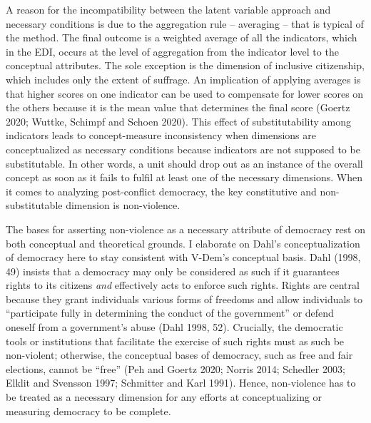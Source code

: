 \documentclass [11pt]{article}
\begin{document}
A reason for the incompatibility between the latent variable approach and necessary conditions is due to the aggregation rule -- averaging -- that is typical of the method. The final outcome is a weighted average of all the indicators, which in the EDI, occurs at the level of aggregation from the indicator level to the conceptual attributes. The sole exception is the dimension of inclusive citizenship, which includes only the extent of suffrage. An implication of applying averages is that higher scores on one indicator can be used to compensate for lower scores on the others because it is the mean value that determines the final score (Goertz 2020; Wuttke, Schimpf and Schoen 2020). This effect of substitutability among indicators leads to concept-measure inconsistency when dimensions are conceptualized as necessary conditions because indicators are not supposed to be substitutable. In other words, a unit should drop out as an instance of the overall concept as soon as it fails to fulfil at least one of the necessary dimensions. When it comes to analyzing post-conflict democracy, the key constitutive and non-substitutable dimension is non-violence.

The bases for asserting non-violence as a necessary attribute of democracy rest on both conceptual and theoretical grounds. I elaborate on Dahl's conceptualization of democracy here to stay consistent with V-Dem's conceptual basis. Dahl (1998, 49) insists that a democracy may only be considered as such if it guarantees rights to its citizens \emph{and} effectively acts to enforce such rights. Rights are central because they grant individuals various forms of freedoms and allow individuals to ``participate fully in determining the conduct of the government'' or defend oneself from a government's abuse (Dahl 1998, 52). Crucially, the democratic tools or institutions that facilitate the exercise of such rights must as such be non-violent; otherwise, the conceptual bases of democracy, such as free and fair elections, cannot be ``free'' (Peh and Goertz 2020; Norris 2014; Schedler 2003; Elklit and Svensson 1997; Schmitter and Karl 1991). Hence, non-violence has to be treated as a necessary dimension for any efforts at conceptualizing or measuring democracy to be complete.
\end{document}
